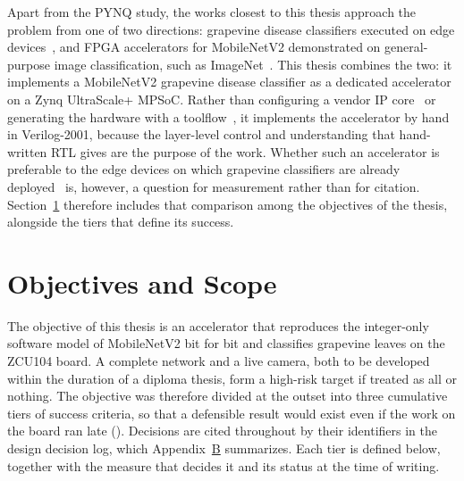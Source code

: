 Apart from the PYNQ study, the works closest to this thesis approach the
problem from one of two directions: grapevine disease classifiers executed on
edge
devices~\cite{morellos2024iot,karim2024grapeedge}, and FPGA accelerators for
MobileNetV2 demonstrated on general-purpose image classification, such as
ImageNet~\cite{bai2018dwsep,wu2019high}. This thesis combines the two: it
implements a MobileNetV2 grapevine disease classifier as a dedicated
accelerator on a Zynq UltraScale+ MPSoC. Rather than configuring a vendor IP
core~\cite{xilinx_pg338} or generating the hardware with a
toolflow~\cite{venieris2018toolflows}, it implements the accelerator by hand
in Verilog-2001, because the layer-level control and understanding that
hand-written RTL gives are the purpose of the work. Whether such an
accelerator is preferable to the edge devices on which grapevine classifiers
are already deployed~\cite{morellos2024iot,karim2024grapeedge} is, however, a
question for measurement rather than for citation.
Section~\ref{sec:objectives} therefore includes that comparison among the
objectives of the thesis, alongside the tiers that define its success.


\section{Objectives and Scope}
\label{sec:objectives}

The objective of this thesis is an accelerator that reproduces the
integer-only software model of MobileNetV2 bit for bit and classifies
grapevine leaves on the ZCU104 board. A complete network and a live camera,
both to be developed within the duration of a diploma thesis, form a
high-risk target if treated as all or nothing. The objective was therefore
divided at the outset into three cumulative tiers of success criteria, so
that a defensible result would exist even if the work on the board ran late
(). Decisions are cited throughout by their identifiers in the design
decision log, which Appendix~\hyperref[appendix:decisions]{B} summarizes. Each
tier is defined below, together with the measure that decides it and its
status at the time of writing.

